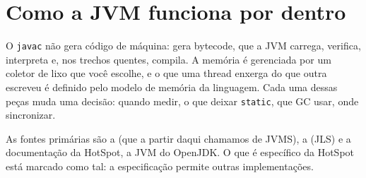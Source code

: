 \chapter{Como a JVM funciona por dentro}
\label{cap:jvm-por-dentro}

\proximasaulas

O \texttt{javac} não gera código de máquina: gera bytecode, que a JVM
carrega, verifica, interpreta e, nos trechos quentes, compila. A memória
é gerenciada por um coletor de lixo que você escolhe, e o que uma thread
enxerga do que outra escreveu é definido pelo modelo de memória da
linguagem. Cada uma dessas peças muda uma decisão: quando medir, o que
deixar \texttt{static}, que GC usar, onde sincronizar.

As fontes primárias são a  (que a partir daqui
chamamos de JVMS), a  (JLS) e a documentação da
HotSpot, a JVM do OpenJDK. O que é específico da HotSpot está marcado
como tal: a especificação permite outras implementações.







